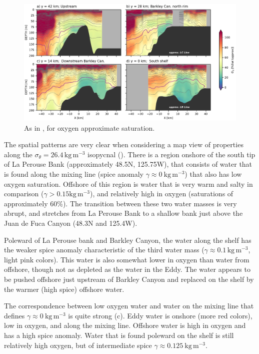 \documentclass[draft]{agujournal2019}
\newcommand*{\Eddy}{{\sc Eddy}}
\begin{document}
\begin{figure}[htbp]
  \begin{center}
    \includegraphics[width=6.2in]{CrossSectionsO2}
    \caption{As in , for oxygen approximate saturation.
      \label{fig:CrossSectionsO2} }
  \end{center}
\end{figure}

The spatial patterns are very clear when considering a map view of properties along the $\sigma_{\theta} = 26.4\,\mathrm{kg\,m^{-3}}$ isopycnal ().  There is a region onshore of the south tip of La Perouse Bank (approximately 48.5\textdegree N, 125.75\textdegree W), that consists of water that is found along the mixing line (spice anomaly $\gamma \approx 0\ \mathrm{kg\,m^{-3}}$) that also has low oxygen saturation.  Offshore of this region is water that is very warm and salty in comparison ($\gamma > 0.15 \mathrm{kg\,m^{-3}}$), and relatively high in oxygen (saturations of approximately 60\%).  The transition between these two water masses is very abrupt, and  stretches from La Perouse Bank to a shallow bank just above the Juan de Fuca Canyon (48.3\textdegree N and 125.4\textdegree W).

Poleward of La Perouse bank and Barkley Canyon, the water along the shelf has the weaker spice anomaly characteristic of the third water mass ($\gamma \approx 0.1\,\mathrm{kg\,m^{-3}}$, light pink colors).  This water is also somewhat lower in oxygen than water from offshore, though not as depleted as the water in the \Eddy.  The water appears to be pushed offshore just upstream of Barkley Canyon and replaced on the shelf by the warmer (high spice) offshore water.

The correspondence between low oxygen water and water on the mixing line that defines $\gamma \approx 0\ \mathrm{kg\,m^{-3}}$ is quite strong (c).  Eddy water is onshore (more red colors), low in oxygen, and along the mixing line.   Offshore water is high in oxygen and has a high spice anomaly.  Water that is found poleward on the shelf is still relatively high oxygen, but of intermediate spice $\gamma \approx 0.125\ \mathrm{kg\,m^{-3}}$.
\end{document}
